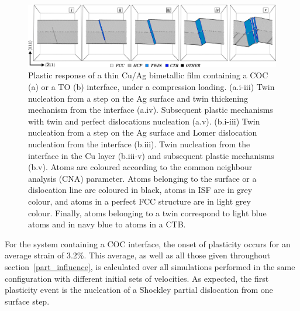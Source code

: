 \documentclass[final,3p,times,twocolumn]{elsarticle}
\begin{document}
\begin{figure}[!t]
	\begin{center}
		\includegraphics[width=150mm]{Pic/fig_s1AgCOC.eps} 
	\end{center}
	\caption{Plastic response of a thin Cu/Ag bimetallic film containing a COC (a) or a TO (b) interface, under a compression loading. 
(a.i-iii) Twin nucleation from a step on the Ag surface and twin thickening mechanism from the interface (a.iv). Subsequent plastic mechanisms with twin and perfect dislocations nucleation (a.v). (b.i-iii) Twin nucleation from a step on the Ag surface and Lomer dislocation nucleation from the interface (b.iii). Twin nucleation from the interface in the Cu layer (b.iii-v) and subsequent plastic mechanisms (b.v).
Atoms are coloured according to the common neighbour analysis (CNA) parameter. Atoms belonging to the surface or a dislocation line are coloured in black, atoms in ISF are in grey colour, and atoms in a perfect FCC structure are in light grey colour. Finally, atoms belonging to a twin correspond to light blue atoms and in navy blue to atoms in a CTB.}\label{fig_s1AgCOC}
\end{figure}
For the system containing a COC interface, the onset of plasticity occurs for an average strain of 3.2\%. This average, as well as all those given throughout section~\ref{part_influence}, is calculated  over all simulations performed in the same configuration with different initial sets of velocities. As expected, the first plasticity event is the nucleation of a Shockley partial dislocation from one surface step. 
\end{document}

